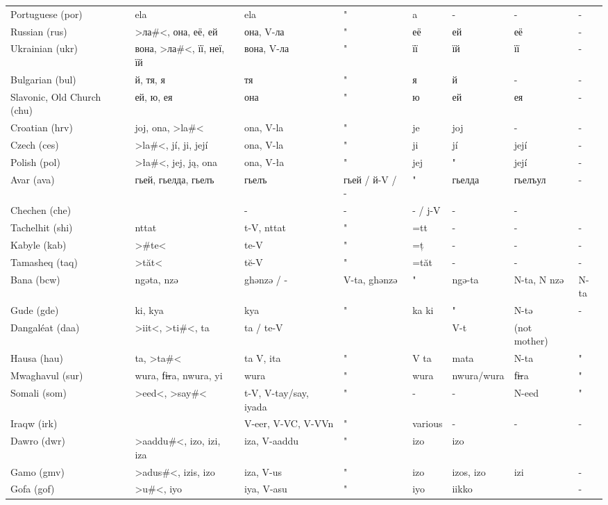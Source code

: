 \begin{landscape}
\begin{longtable}{*{8}{l}}
Portuguese (por)	&	ela	&	ela	&	"	&	a	&	 -	&	 -	&	 -	\\
Russian (rus)	&	>ла\#<, она, её, ей	&	она, V-ла	&	"	&	её	&	ей	&	её	&	 -	\\
Ukrainian (ukr)	&	вона, >ла\#<, її, неї, {їй}	&	вона, V-ла	&	"	&	її	&	їй	&	її 	&	 -	\\
Bulgarian (bul)	&	й, тя, я	&	тя 	&	"	&	я 	&	й	&	 -	&	 -	\\
Slavonic, Old Church (chu)	&	ей, ю, ея	&	она	&	"	&	ю 	&	ей	&	ея	&	 -	\\
Croatian (hrv)	&	joj, ona, {>la\#<}	&	ona, V-la	&	"	&	je	&	joj	&	 -	&	 -	\\
Czech (ces)	&	>la\#<, jí, {ji, její}	&	ona, V-la	&	"	&	ji	&	jí	&	její	&	 -	\\
Polish (pol)	&	>ła\#<, jej, ją, {ona}	&	ona, V-ła	&	"	&	jej	&	"	&	její	&	 -	\\
Avar (ava)	&	гьей, гьелда, гьелъ	&	гьелъ	&	гьей / й-V / -	&	"	&	гьелда 	&	гьелъул 	&	 -	\\
Chechen (che)	&		&	 -	&	 -	&	 - / j-V	&	 -	&	 -	&		\\
Tachelhit (shi)	&	nttat	&	t-V, nttat	&	"	&	 =tt	&	 -	&	 -	&	 -	\\
Kabyle (kab)	&	{>\#te<}	&	te-V	&	"	&	 =ț	&	 -	&	 -	&	 -	\\
Tamasheq (taq)	&	>tăt<	&	tĕ-V	&	"	&	 =tăt 	&	 -	&	 -	&	 -	\\
Bana (bcw)	&	ngəta, nzə	&	ghənzə / -	&	V-ta, ghənzə 	&	"	&	ngə-ta 	&	N-ta, N nzə 	&	N-ta	\\
Gude (gde)	&	ki, kya	&	kya	&	"	&	ka ki	&	"	&	N-tə	&	 -	\\
Dangaléat (daa)	&	>iit<, >ti\#<, ta	&	ta / te-V	&		&		&	V-t	&	 (not mother)	&		\\
Hausa (hau)	&	ta, >ta\#<	&	ta V, ita	&	"	&	V ta	&	mata	&	N-ta	&	"	\\
Mwaghavul (sur)	&	wura, fi̶ra, nwura, {yi}	&	wura	&	"	&	wura	&	nwura/wura	&	fi̶ra 	&	"	\\
Somali (som)	&	>eed<, {>say\#<}	&	t-V, V-tay/say, iyada	&	"	&	 -	&	 -	&	N-eed	&	"	\\
Iraqw (irk)	&		&	V-eer, V-VC, V-VVn	&	"	&	various	&	-	&	-	&	-	\\
Dawro (dwr)	&	>aaddu\#<, izo, izi, iza	&	iza, V-aaddu	&	"	&	izo	&	izo	&		&		\\
Gamo (gmv)	&	>adus\#<, izis, {izo}	&	iza, V-us	&	"	&	izo	&	izos, izo	&	izi	&	 -	\\
Gofa (gof)	&	>u\#<, {iyo}	&	iya, V-asu	&	"	&	iyo	&	iikko	&		&	 -	\\

\end{longtable}
\end{landscape}
